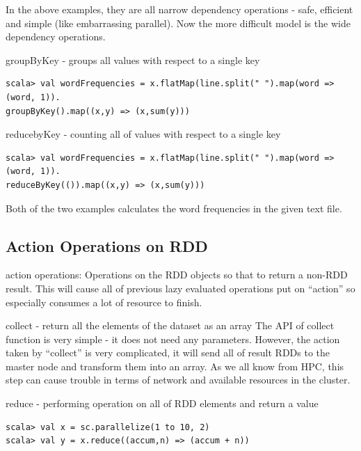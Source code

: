 \documentclass[notheorems, aspectratio=54]{beamer}
\begin{document}

\begin{frame}[fragile]

In the above examples, they are all narrow dependency operations - safe, efficient and simple (like embarrassing parallel). 
Now the more difficult model is the wide dependency operations.

\begin{block}{groupByKey - groups all values with respect to a single key}
\begin{verbatim}
scala> val wordFrequencies = x.flatMap(line.split(" ").map(word => (word, 1)).
groupByKey().map((x,y) => (x,sum(y)))
\end{verbatim}
\end{block}


\begin{block}{reducebyKey - counting all of values with respect to a single key}
\begin{verbatim}
scala> val wordFrequencies = x.flatMap(line.split(" ").map(word => (word, 1)).
reduceByKey(()).map((x,y) => (x,sum(y)))
\end{verbatim}
\end{block}
Both of the two examples calculates the word frequencies in the given text file.

\end{frame}

\subsection{Action Operations on RDD}
\begin{frame}[fragile]

\begin{block}{action operations:}
  Operations on the RDD objects so that to return a non-RDD result. This will cause all of 
  previous lazy evaluated operations put on ``action'' so especially consumes a lot of resource to finish.
\end{block}

\begin{block}{collect - return all the elements of the dataset as an array}
The API of collect function is very simple - it does not need any parameters. However, the action taken by ``collect'' is very 
complicated, it will send all of result RDDs to the master node and transform them into an array. As we all know from HPC, this step
can cause trouble in terms of network and available resources in the cluster.
\end{block}


\begin{block}{reduce - performing operation on all of RDD elements and return a value}
\begin{verbatim}
scala> val x = sc.parallelize(1 to 10, 2)
scala> val y = x.reduce((accum,n) => (accum + n)) 
\end{verbatim}
\end{block}

\end{frame}
\end{document}
